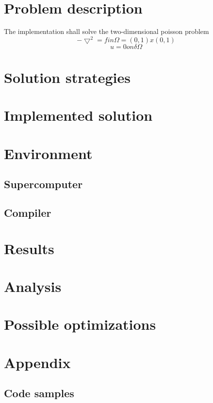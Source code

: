\documentclass{article}
\begin{document}
\section{Problem description}
The implementation shall solve the two-dimensional poisson problem 
\begin{equation}
-\bigtriangledown^2=f in \Omega = (0,1)x(0,1)
\end{equation}
\begin{equation}
u = 0 on \delta\Omega
\end{equation}
\section{Solution strategies}

\section{Implemented solution}

\section{Environment}
\subsection{Supercomputer}

\subsection{Compiler}

\section{Results}

\section{Analysis}

\section{Possible optimizations}

\section{Appendix}
\subsection{Code samples}
\end{document}
